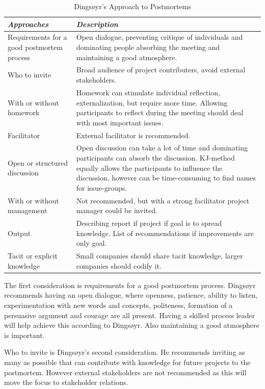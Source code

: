 \begin{table}[h]
	\begin{center}
		\caption{Dingsøyr's Approach to Postmortems}
		\label{table:postmortem-approach}
		\begin{tabular}{p{} p{}}
			\hline
			\textit{Approaches} & \textit{Description} \\
			\hline
			Requirements for a good postmortem process & Open dialogue, preventing critique of individuals and dominating people absorbing the meeting and maintaining a good atmosphere. \\
			Who to invite & Broad audience of project contributers, avoid external stakeholders. \\
			With or without homework & Homework can stimulate individual reflection, externalization, but require more time. Allowing participants to reflect during the meeting should deal with most important issues. \\
			Facilitator & External facilitator is recommended. \\
			Open or structured discussion & Open discussion can take a lot of time and dominating participants can absorb the discussion. KJ-method equally allows the participants to influence the discussion, however can be time-consuming to find names for issue-groups. \\
				With or without management & Not recommended, but with a strong facilitator project manager could be invited. \\
			Output & Describing report if project if goal is to spread knowledge. List of recommendations if improvements are only goal. \\
			Tacit or explicit knowledge & Small companies should share tacit knowledge, larger companies should codify it. \\
			\hline
		\end{tabular}
	\end{center}
\end{table}

The first consideration is requirements for a good postmortem process. Dingsøyr recommends having an open dialogue, where openness, patience, ability to listen, experimentation with new words and concepts, politeness, formation of a persuasive argument and courage are all present. Having a skilled process leader will help achieve this according to Dingsøyr. Also maintaining a good atmosphere is important. 

Who to invite is Dingsøyr's second consideration. He recommends inviting as many as possible that can contribute with knowledge for future projects to the postmortem. However external stakeholders are not recommended as this will move the focus to stakeholder relations. 

